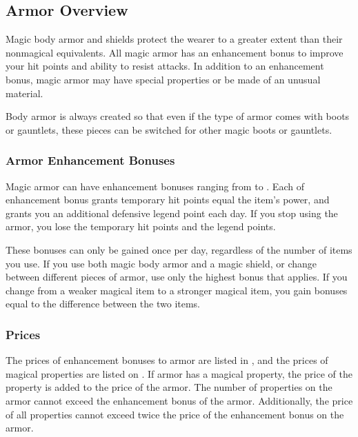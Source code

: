     \subsection{Armor Overview}

        Magic body armor and shields protect the wearer to a greater extent than their nonmagical equivalents.
        All magic armor has an enhancement bonus to improve your hit points and ability to resist attacks.
        In addition to an enhancement bonus, magic armor may have special properties or be made of an unusual material.

        Body armor is always created so that even if the type of armor comes with boots or gauntlets, these pieces can be switched for other magic boots or gauntlets.

        \subsubsection{Armor Enhancement Bonuses}\label{Armor Enhancement Bonuses}

            Magic armor can have enhancement bonuses ranging from  to .
            Each  of enhancement bonus grants temporary hit points equal the item's power, and grants you an additional defensive legend point each day.
            If you stop using the armor, you lose the temporary hit points and the legend points.

            These bonuses can only be gained once per day, regardless of the number of items you use.
            If you use both magic body armor and a magic shield, or change between different pieces of armor, use only the highest bonus that applies.
            If you change from a weaker magical item to a stronger magical item, you gain bonuses equal to the difference between the two items.

        \subsubsection{Prices}\label{Armor Prices}
            The prices of enhancement bonuses to armor are listed in , and the prices of magical properties are listed on .
            If armor has a magical property, the price of the property is added to the price of the armor.
            The number of properties on the armor cannot exceed the enhancement bonus of the armor.
            Additionally, the price of all properties cannot exceed twice the price of the enhancement bonus on the armor.

